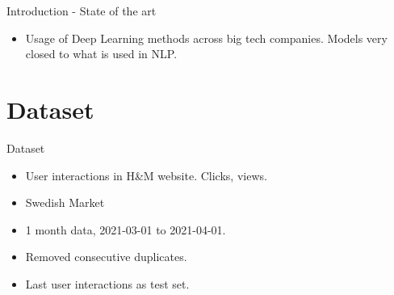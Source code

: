 \documentclass{beamer}
\begin{document}
\begin{frame}{Introduction - State of the art}
\begin{figure}[!htb]
\endminipage
\end{figure}
\begin{itemize}
\item Usage of Deep Learning methods across big tech companies. Models very closed to what is used in NLP.
\end{itemize} 

\end{frame}

\section{Dataset}
\begin{frame}{Dataset}
\begin{itemize}
    \item User interactions in H\&M website. Clicks, views.
    \item Swedish Market
    \item 1 month data, 2021-03-01 to 2021-04-01.
    \item Removed consecutive duplicates.
    \item Last user interactions as test set.
\end{itemize}
\end{frame}
\end{document}
